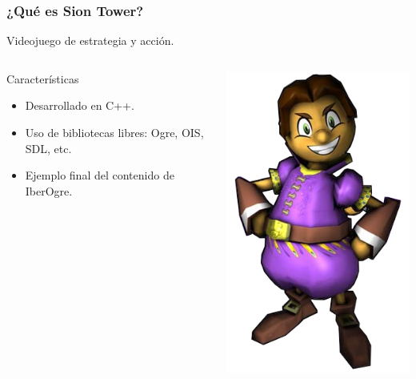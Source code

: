 \documentclass[green]{beamer}
\begin{document}
\begin{frame}
\transdissolve
    \frametitle{¿Qué es Sion Tower?}
    
    Videojuego de estrategia y acción.

    \begin{columns}[c]
    \column{200pt}
        
	\begin{block}{Características}
            \begin{itemize}
                \item Desarrollado en C++.
		\item Uso de bibliotecas libres: Ogre, OIS, SDL, etc.
                \item Ejemplo final del contenido de IberOgre.
            \end{itemize}            
        \end{block}

    \column{100pt}
        
	\begin{center}
	    \includegraphics[scale=0.2]{img/personaje.png}
	\end{center}
    \end{columns} 
\end{frame}
\end{document}
